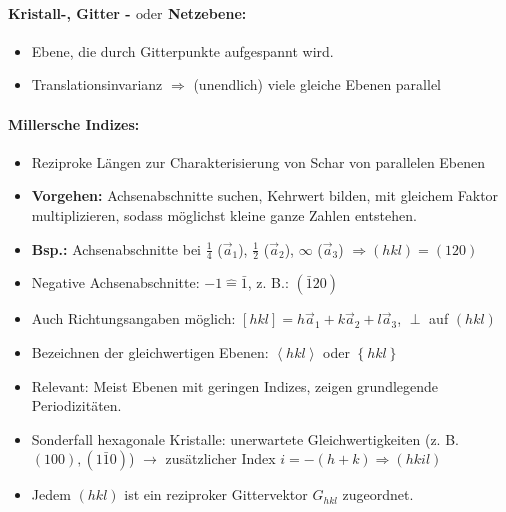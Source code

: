 \documentclass[a4paper,12pt]{article}
\begin{document}
\paragraph*{Kristall-, Gitter - $\mathrm{oder}$ Netzebene:} \begin{itemize}
	\item Ebene, die durch Gitterpunkte aufgespannt wird.
	\item Translationsinvarianz $ \Rightarrow $ (unendlich) viele gleiche Ebenen parallel
\end{itemize}
\paragraph*{Millersche Indizes:}
\begin{itemize}
	\item Reziproke Längen zur Charakterisierung von Schar von parallelen Ebenen
	\item \textbf{Vorgehen:} Achsenabschnitte suchen, Kehrwert bilden, mit gleichem Faktor multiplizieren, sodass möglichst kleine ganze Zahlen entstehen.
	\item \textbf{Bsp.:} Achsenabschnitte bei $ \frac14 $ ($\vec a_1$), $ \frac12 $ ($\vec a_2$), $\infty $ ($\vec a_3$) $ \Rightarrow (hkl) = (120) $
	\item Negative Achsenabschnitte: $ -1 \hat = \bar 1 $, z. B.: $ (\bar 120) $
	\item Auch Richtungsangaben möglich: $ [hkl]= h \vec a_1 + k \vec a_2 + l \vec a_3 $, $ \perp $ auf $ (hkl) $
	\item Bezeichnen der gleichwertigen Ebenen: $ \left<hkl\right> $ oder $ \left\{hkl\right\} $
	\item Relevant: Meist Ebenen mit geringen Indizes, zeigen grundlegende Periodizitäten.
	\item Sonderfall hexagonale Kristalle: unerwartete Gleichwertigkeiten (z. B. $ (100), (1\bar 1 0) $) $ \rightarrow $ zusätzlicher Index $ i= -(h+k) \Rightarrow (hkil)$
	\item Jedem $ (hkl) $ ist ein reziproker Gittervektor $ G_{hkl} $ zugeordnet.
\end{itemize}
\end{document}
